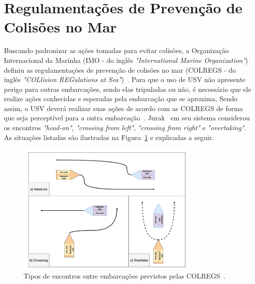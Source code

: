     \section{Regulamentações de Prevenção de Colisões no Mar}\label{subchap2:colregs}
        Buscando padronizar as ações tomadas para evitar colisões, a Organização Internacional da Marinha (IMO - do inglês \textit{"International Marine Organization"}) definiu as regulamentações de prevenção de colisões no mar (COLREGS - do inglês \textit{"COLlision REGulations at Sea"})~\cite{COLREGS}.
        Para que o uso de USV não apresente perigo para outras embarcações, sendo elas tripuladas ou não, é necessário que ele realize ações conhecidas e esperadas pela embarcação que se aproxima. Sendo assim, o USV deverá realizar suas ações de acordo com as COLREGS de forma que seja perceptível para a outra embarcação~\cite{KUWATA2014110}. Jurak~\cite{JURAK2020} em seu sistema considerou os encontros \textit{"head-on"}, \textit{"crossing from left"}, \textit{"crossing from right"} e \textit{"overtaking"}. As situações listadas são ilustradas na Figura~\ref{fig:Jurak2020_colregsSituations} e explicadas a seguir. 
        
        \begin{figure}
            \centering
            \includegraphics[width=0.8\textwidth]{fig/chap2/colregs_situations.png}
            \caption{Tipos de encontros entre embarcações previstos pelas COLREGS~\cite{JURAK2020}.}
            \label{fig:Jurak2020_colregsSituations}
        \end{figure}
        
